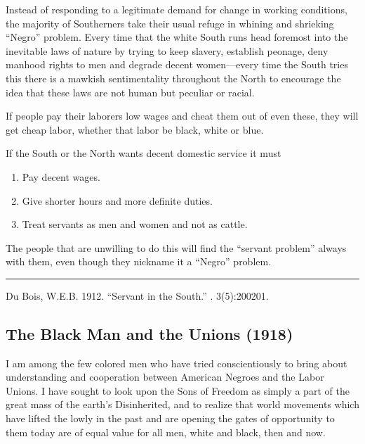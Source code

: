 \documentclass[letterpaper,10pt,english]{jupyterBook}
\begin{document}
\sphinxAtStartPar
Instead of responding to a legiti­mate demand for change in working conditions, the majority of South­erners take their usual refuge in whining and shrieking “Negro” problem. Every time that the white South runs head foremost into the inevitable laws of nature by trying to keep slavery, establish peonage, deny manhood rights to men and de­grade decent women—every time the
South tries this there is a mawkish sentimentality throughout the North to encourage the idea that these laws are not human but peculiar or racial.

\sphinxAtStartPar
If people pay their laborers low wages and cheat them out of even these, they will get cheap labor, whether that labor be black, white or blue.

\sphinxAtStartPar
If the South or the North wants de­cent domestic service it must
\begin{enumerate}
%
\item {} 
\sphinxAtStartPar
Pay decent wages.

\item {} 
\sphinxAtStartPar
Give shorter hours and more definite duties.

\item {} 
\sphinxAtStartPar
Treat servants as men and women and not as cattle.

\end{enumerate}

\sphinxAtStartPar
The people that are unwilling to do this will find the “servant problem” always with them, even though they nickname it a “Negro” problem.


\bigskip\hrule\bigskip


\sphinxAtStartPar
{} Du Bois, W.E.B. 1912. “Servant in the South.”  . 3(5):200\sphinxhyphen{}201.


\subsection{The Black Man and the Unions (1918)}
\label{\detokenize{Volumes/15/05/the_black_man_and_the_unions:the-black-man-and-the-unions-1918}}\label{\detokenize{Volumes/15/05/the_black_man_and_the_unions::doc}}
\sphinxAtStartPar
I am among the few colored men who have tried conscientiously to bring about understanding and co\sphinxhyphen{}operation between American Negroes and the Labor Unions. I have sought to look upon the Sons of Freedom as simply a part of the great mass of the earth’s Disinherited, and to realize that world movements which have lifted the lowly in the past and are opening the gates of opportunity to them today are of equal value for all men, white and black, then and now.
\end{document}
